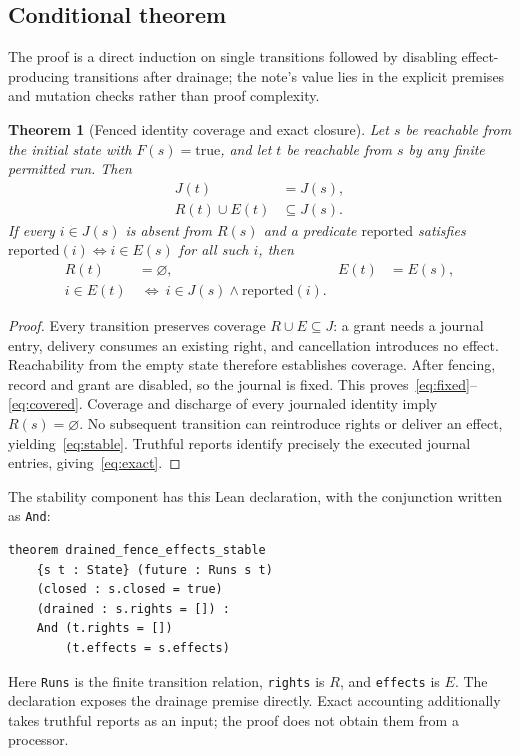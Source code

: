 \documentclass[letterpaper]{article}
\newtheorem{theorem}{Theorem}
\newcommand{\code}[1]{\texttt{#1}}
\begin{document}
\subsection{Conditional theorem}
The proof is a direct induction on single transitions followed by disabling
effect-producing transitions after drainage; the note's value lies in the
explicit premises and mutation checks rather than proof complexity.
\begin{samepage}
\begin{theorem}[Fenced identity coverage and exact closure]
Let $s$ be reachable from the initial state with $F(s)=\mathrm{true}$, and let
$t$ be reachable from $s$ by any finite permitted run. Then
\begin{align}
J(t)&=J(s),\label{eq:fixed}\\
R(t)\cup E(t)&\subseteq J(s).\label{eq:covered}
\end{align}
If every $i\in J(s)$ is absent from $R(s)$ and a predicate $\mathrm{reported}$
satisfies $\mathrm{reported}(i)\Leftrightarrow i\in E(s)$ for all such $i$, then
\begin{align}
R(t)&=\varnothing,& E(t)&=E(s),\label{eq:stable}\\
i\in E(t)&\ \Longleftrightarrow\ i\in J(s)\land\mathrm{reported}(i).
\label{eq:exact}
\end{align}
\end{theorem}
\end{samepage}



\begin{proof}
Every transition preserves coverage $R\cup E\subseteq J$: a grant needs a
journal entry, delivery consumes an existing right, and cancellation introduces
no effect. Reachability from the empty state therefore establishes coverage.
After fencing, record and grant are disabled, so the journal is fixed. This
proves~\eqref{eq:fixed}--\eqref{eq:covered}. Coverage and discharge of every
journaled identity imply $R(s)=\varnothing$. No subsequent transition can
reintroduce rights or deliver an effect, yielding~\eqref{eq:stable}. Truthful
reports identify precisely the executed journal entries, giving~\eqref{eq:exact}.
\end{proof}




The stability component has this Lean declaration, with the conjunction
written as \code{And}:
\begin{verbatim}
theorem drained_fence_effects_stable
    {s t : State} (future : Runs s t)
    (closed : s.closed = true)
    (drained : s.rights = []) :
    And (t.rights = [])
        (t.effects = s.effects)
\end{verbatim}
Here \code{Runs} is the finite transition relation, \code{rights} is $R$, and
\code{effects} is $E$. The declaration exposes the drainage premise directly.
Exact accounting additionally takes truthful reports as an input; the proof
does not obtain them from a processor.
\end{document}

